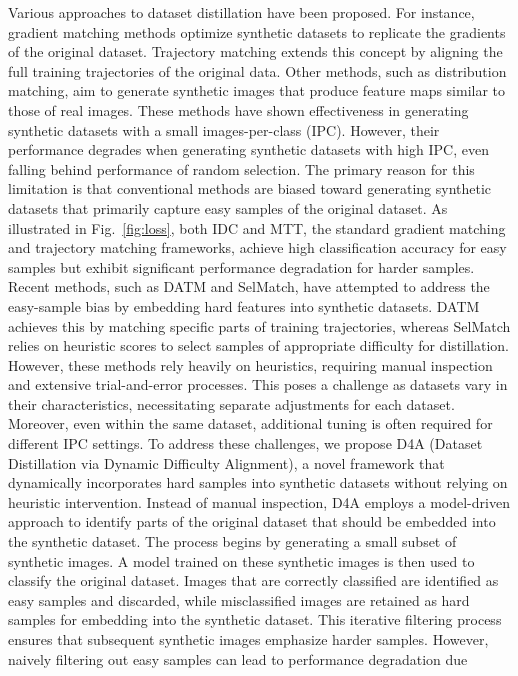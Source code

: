 \documentclass{article}
\theoremstyle{plain}
\theoremstyle{definition}
\theoremstyle{remark}
\begin{document}
Various approaches to dataset distillation have been proposed.
For instance, gradient matching methods optimize synthetic datasets to replicate the gradients
of the original dataset. Trajectory matching extends this concept by aligning the full
training trajectories of the original data. Other methods, such as distribution matching,
aim to generate synthetic images that produce feature maps similar to those of real images.
These methods have shown effectiveness in generating synthetic datasets with a small images-per-class (IPC).
However, their performance degrades when generating synthetic datasets with high IPC, even falling behind performance of random selection.
The primary reason for this limitation is that conventional methods are biased toward
generating synthetic datasets that primarily capture easy samples of the original dataset.
As illustrated in Fig.~\ref{fig:loss}, both IDC and MTT, the standard gradient matching and
trajectory matching frameworks, achieve high classification accuracy for easy samples but
exhibit significant performance degradation for harder samples.
Recent methods, such as DATM and SelMatch, have attempted to address the easy-sample bias by
embedding hard features into synthetic datasets. DATM achieves this by matching specific parts
of training trajectories, whereas SelMatch relies on heuristic scores to select
samples of appropriate difficulty for distillation.
However, these methods rely heavily on heuristics, requiring manual inspection and extensive
trial-and-error processes. This poses a challenge as datasets vary in their
characteristics, necessitating separate adjustments for each dataset. Moreover, even within
the same dataset, additional tuning is often required for different IPC settings.
To address these challenges, we propose D4A (Dataset Distillation via Dynamic Difficulty Alignment),
a novel framework that dynamically incorporates hard samples into synthetic datasets without
relying on heuristic intervention. Instead of manual inspection, D4A employs
a model-driven approach to identify parts of the original dataset that should be embedded
into the synthetic dataset.
The process begins by generating a small subset of synthetic images.
A model trained on these synthetic images is then used to classify the original dataset.
Images that are correctly classified are identified as easy samples and discarded,
while misclassified images are retained as hard samples for embedding into the synthetic dataset.
This iterative filtering process ensures that subsequent synthetic images emphasize harder samples.
However, naively filtering out easy samples can lead to performance degradation due
\end{document}
